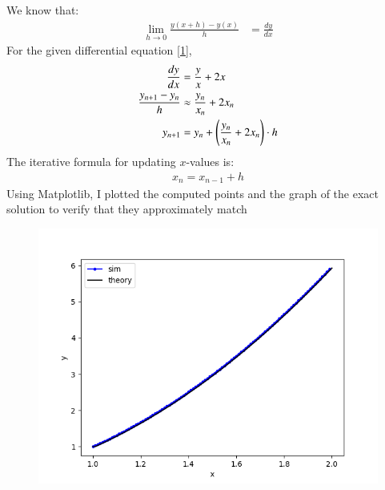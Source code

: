\documentclass[journal]{IEEEtran}
\numberwithin{equation}{enumi}
\numberwithin{figure}{enumi}
\begin{document}
We know that:
\begin{align}
   \lim_{h \to 0} \frac{y(x+h) - y(x)}{h} &= \frac{dy}{dx} 
\end{align}
For the given differential equation \ref{1},
\begin{align}
    \frac{dy}{dx}&= \frac{y}{x}+2x\\
    \frac{y_{n+1} - y_n}{h}&\approx \frac{y_n}{x_n}+2x_n\\
    y_{n+1} &= y_n + \left(\frac{y_n}{x_n}+2x_n\right)\cdot h
\end{align}
The iterative formula for updating $x$-values is: 
\begin{align}
    x_n=x_{n-1}+h
\end{align}
Using Matplotlib, I plotted the computed points and the graph of the exact solution to verify that they approximately match
\begin{figure}[!ht]
    \centering
    \includegraphics[width=\columnwidth]{figs/Figure_1.png}
    \caption{}
\end{figure}
\end{document}
